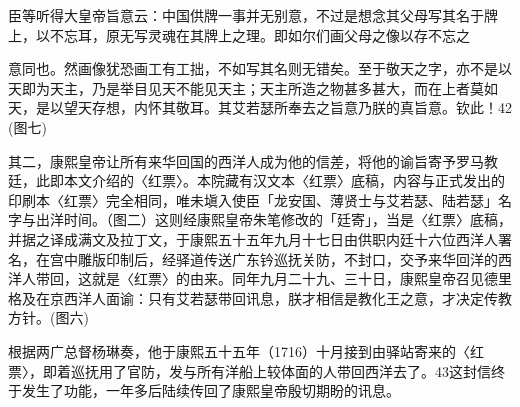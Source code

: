 \begin{BookQuote}
臣等听得大皇帝旨意云：中国供牌一事并无别意，不过是想念其父母写其名于牌上，以不忘耳，原无写灵魂在其牌上之理。即如尔们画父母之像以存不忘之
\end{BookQuote}

\vfill
\begin{BookNotes}
\end{BookNotes}

\noindent 意同也。然画像犹恐画工有工拙，不如写其名则无错矣。至于敬天之字，亦不是以天即为天主，乃是举目见天不能见天主；天主所造之物甚多甚大，而在上者莫如天，是以望天存想，内怀其敬耳。其艾若瑟所奉去之旨意乃朕的真旨意。钦此！42 (图七)


\vfill
\begin{BookNotes}
\end{BookNotes}


其二，康熙皇帝让所有来华回国的西洋人成为他的信差，将他的谕旨寄予罗马教廷，此即本文介绍的〈红票〉。本院藏有汉文本〈红票〉底稿，内容与正式发出的印刷本〈红票〉完全相同，唯未塡入使臣「龙安国、薄贤士与艾若瑟、陆若瑟」名字与出洋时间。（图二）这则经康熙皇帝朱笔修改的「廷寄」，当是〈红票〉底稿，并据之译成满文及拉丁文，于康熙五十五年九月十七日由供职内廷十六位西洋人署名，在宫中雕版印制后，经驿道传送广东钤巡抚关防，不封口，交予来华回洋的西洋人带回，这就是〈红票〉的由来。同年九月二十九、三十日，康熙皇帝召见德里格及在京西洋人面谕：只有艾若瑟带回讯息，朕才相信是教化王之意，才决定传教方针。(图六)

根据两广总督杨琳奏，他于康熙五十五年（1716）十月接到由驿站寄来的〈红票〉，即着巡抚用了官防，发与所有洋船上较体面的人带回西洋去了。43这封信终于发生了功能，一年多后陆续传回了康熙皇帝殷切期盼的讯息。

